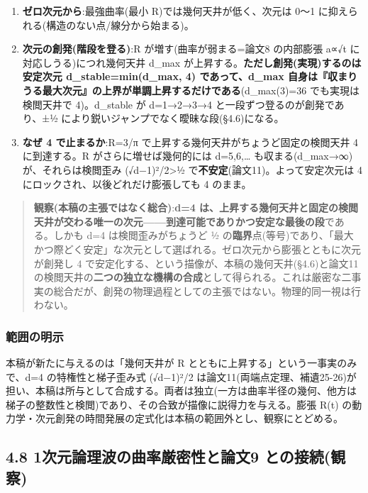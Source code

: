 \documentclass[
]{ltjsarticle}
\begin{document}
\begin{enumerate}
\def\labelenumi{(\roman{enumi})}
\item
  \textbf{ゼロ次元から}:最強曲率(最小 R)では幾何天井が低く、次元は 0〜1
  に抑えられる(構造のない点/線分から始まる)。
\item
  \textbf{次元の創発(階段を登る)}:R が増す(曲率が弱まる=論文8 の内部膨張
  a∝√t に対応しうる)につれ幾何天井 d\_max
  が上昇する。\textbf{ただし創発(実現)するのは安定次元
  d\_stable=min(d\_max, 4) であって、d\_max
  自身は『収まりうる最大次元』の上界が単調上昇するだけである}(d\_max(3)=36
  でも実現は検閲天井で 4)。d\_stable が d=1→2→3→4
  と一段ずつ登るのが創発であり、±½
  により鋭いジャンプでなく曖昧な段(§4.6)になる。
\item
  \textbf{なぜ 4 で止まるか}:R=3/π
  で上昇する幾何天井がちょうど固定の検閲天井 4 に到達する。R
  がさらに増せば幾何的には d=5,6,\ldots{}
  も収まる(d\_max→∞)が、それらは検閲歪み (√d−1)²/2\textgreater½
  で\textbf{不安定}(論文11)。よって安定次元は 4
  にロックされ、以後どれだけ膨張しても 4 のまま。
\end{enumerate}

\begin{quote}
\textbf{観察(本稿の主張ではなく総合)}:\textbf{d=4
は、上昇する幾何天井と固定の検閲天井が交わる唯一の次元------到達可能でありかつ安定な最後の段}である。しかも
d=4 は検閲歪みがちょうど ½
の\textbf{臨界}点(等号)であり、「最大かつ際どく安定」な次元として選ばれる。ゼロ次元から膨張とともに次元が創発し
4 で安定化する、という描像が、本稿の幾何天井(§4.6)と論文11
の検閲天井の\textbf{二つの独立な機構の合成}として得られる。これは厳密な二事実の総合だが、創発の物理過程としての主張ではない。物理的同一視は行わない。
\end{quote}

\subsubsection{範囲の明示}\label{ux7bc4ux56f2ux306eux660eux793a}

本稿が新たに与えるのは「幾何天井が R
とともに上昇する」という一事実のみで、d=4 の特権性と梯子歪み式 (√d−1)²/2
は論文11(両端点定理、補遺25-26)が担い、本稿は所与として合成する。両者は独立(一方は曲率半径の幾何、他方は梯子の整数性と検閲)であり、その合致が描像に説得力を与える。膨張
R(t)
の動力学・次元創発の時間発展の定式化は本稿の範囲外とし、観察にとどめる。

\subsection{4.8 1次元論理波の曲率厳密性と論文9
との接続(観察)}\label{ux6b21ux5143ux8ad6ux7406ux6ce2ux306eux66f2ux7387ux53b3ux5bc6ux6027ux3068ux8ad6ux65879-ux3068ux306eux63a5ux7d9aux89b3ux5bdf}
\end{document}
